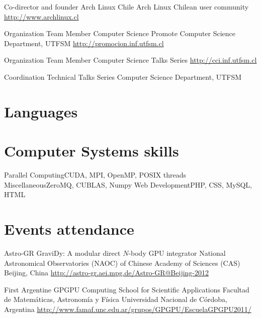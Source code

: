 \documentclass[11pt,a4paper]{moderncv}
\begin{document}
        {Co-director and founder}
        {Arch Linux Chile}
        {Arch Linux Chilean user community}
        {\url{http://www.archlinux.cl}}
        {}

        {Organization Team Member}
        {Computer Science Promote}
        {Computer Science Department, UTFSM}
        {\url{http://promocion.inf.utfsm.cl}}
        {}

        {Organization Team Member}
        {Computer Science Talks Series}
        {\url{http://cci.inf.utfsm.cl}}
        {}{}

        {Coordination}
        {Technical Talks Series}
        {Computer Science Department, UTFSM}
        {}{}


\section{Languages}

\section{Computer Systems skills}
           {Parallel Computing}{CUDA, MPI, OpenMP, POSIX threads}
           {Miscellaneous}{ZeroMQ, CUBLAS, Numpy}
           {Web Development}{PHP, CSS, MySQL, HTML}

\section{Events attendance}

        {Astro-GR}
        {GraviDy: A modular direct $N$-body GPU integrator}
        {National Astronomical Observatories (NAOC) of Chinese Academy of Sciences
        (CAS)}
        {Beijing, China}
        {\url{http://astro-gr.aei.mpg.de/Astro-GR@Beijing-2012}}

        {First Argentine GPGPU Computing School for Scientific Applications}
        {Facultad de Matemáticas, Astronomía y Física}
        {Universidad Nacional de Córdoba, Argentina}
        {\url{http://www.famaf.unc.edu.ar/grupos/GPGPU/EscuelaGPGPU2011/}}
        {}
\end{document}
